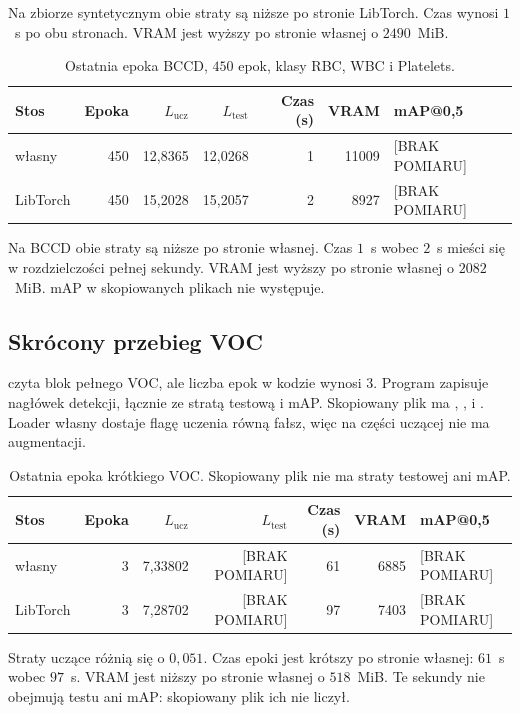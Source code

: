 Na zbiorze syntetycznym obie straty są niższe po stronie LibTorch. Czas wynosi \(1\)~s po obu stronach. VRAM jest wyższy po stronie własnej o \(2490\)~MiB.

\begin{table}[ht]
\centering
\caption{Ostatnia epoka BCCD, \(450\) epok, klasy RBC, WBC i Platelets.}
\label{tab:bccd}
\small
\begin{tabular}{lrrrrrl}
\toprule
Stos & Epoka & \(L_{\mathrm{ucz}}\) & \(L_{\mathrm{test}}\) & Czas (s) & VRAM & mAP@0,5 \\
\midrule
własny & 450 & 12{,}8365 & 12{,}0268 & 1 & 11009 & [BRAK POMIARU] \\
LibTorch & 450 & 15{,}2028 & 15{,}2057 & 2 & 8927 & [BRAK POMIARU] \\
\bottomrule
\end{tabular}
\end{table}

Na BCCD obie straty są niższe po stronie własnej. Czas \(1\)~s wobec \(2\)~s mieści się w rozdzielczości pełnej sekundy. VRAM jest wyższy po stronie własnej o \(2082\)~MiB. mAP w skopiowanych plikach nie występuje.

\subsection{Skrócony przebieg VOC}

 czyta blok pełnego VOC, ale liczba epok w kodzie wynosi \(3\). Program zapisuje nagłówek detekcji, łącznie ze stratą testową i mAP. Skopiowany plik ma , ,  i . Loader własny dostaje flagę uczenia równą fałsz, więc na części uczącej nie ma augmentacji.

\begin{table}[ht]
\centering
\caption{Ostatnia epoka krótkiego VOC. Skopiowany plik nie ma straty testowej ani mAP.}
\label{tab:voc-krotki}
\small
\begin{tabular}{lrrrrrl}
\toprule
Stos & Epoka & \(L_{\mathrm{ucz}}\) & \(L_{\mathrm{test}}\) & Czas (s) & VRAM & mAP@0,5 \\
\midrule
własny & 3 & 7{,}33802 & [BRAK POMIARU] & 61 & 6885 & [BRAK POMIARU] \\
LibTorch & 3 & 7{,}28702 & [BRAK POMIARU] & 97 & 7403 & [BRAK POMIARU] \\
\bottomrule
\end{tabular}
\end{table}

Straty uczące różnią się o \(0{,}051\). Czas epoki jest krótszy po stronie własnej: \(61\)~s wobec \(97\)~s. VRAM jest niższy po stronie własnej o \(518\)~MiB. Te sekundy nie obejmują testu ani mAP: skopiowany plik ich nie liczył.

